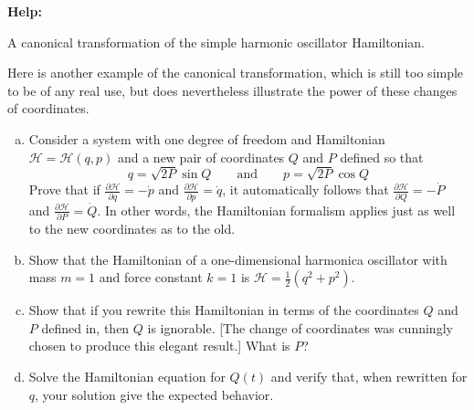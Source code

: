 \documentclass[11pt,letterpaper,boxed]{../hmcpsetrhino}
\newcommand{\half}{\frac{1}{2}}
\newcommand\pd[2]{\frac{\partial #1}{\partial #2}}
\def\Ham{\mathcal{H}}
\begin{document}
\textbf{Help:}

\begin{problem}[i]
A canonical transformation of the simple harmonic oscillator Hamiltonian.

\begin{problem}[13.25]
Here is another example of the canonical transformation, which is still too simple to be of any real use, but does nevertheless illustrate the power of these changes of coordinates.

\begin{enumerate}[(a)]
\item Consider a system with one degree of freedom and Hamiltonian $\Ham = \Ham(q,p)$ and a new pair of coordinates $Q$ and $P$ defined so that
\[	q = \sqrt{2P} \sin Q \qquad \text{and} \qquad p = \sqrt{2P} \cos Q\]
Prove that if $\pd \Ham q = -\dot p$ and $\pd \Ham p = \dot q$, it automatically follows that $\pd \Ham Q = -\dot P$ and $\pd \Ham P = \dot Q$. In other words, the Hamiltonian formalism applies just as well to the new coordinates as to the old. 
\item Show that the Hamiltonian of a one-dimensional harmonica oscillator with mass $m = 1$ and force constant $k = 1$ is $\Ham = \half( q^2 + p^2)$.

\item Show that if you rewrite this Hamiltonian in terms of the coordinates $Q$ and $P$ defined in, then $Q$ is ignorable. [The change of coordinates was cunningly chosen to produce this elegant result.] What is $P$? 

\item Solve the Hamiltonian equation for $Q(t)$ and verify that, when rewritten for $q$, your solution give the expected behavior.
\end{enumerate}
\end{problem}
\end{problem}
\begin{solution}


\vfill
\end{solution}


\newpage
\end{document}

